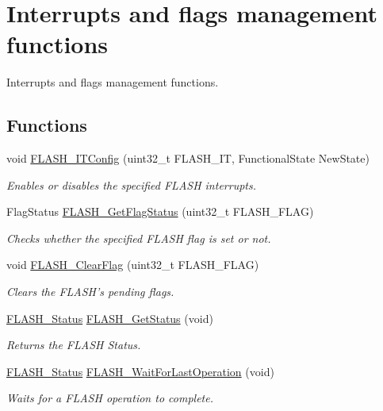 \hypertarget{group___f_l_a_s_h___group4}{\section{Interrupts and flags management functions}
\label{group___f_l_a_s_h___group4}
}


Interrupts and flags management functions.  


\subsection*{Functions}
\begin{DoxyCompactItemize}
\item 
void \hyperlink{group___f_l_a_s_h___group4_ga94c1e51a9c3bf8d48eb6eb4a4d054861}{F\-L\-A\-S\-H\-\_\-\-I\-T\-Config} (uint32\-\_\-t F\-L\-A\-S\-H\-\_\-\-I\-T, Functional\-State New\-State)
\begin{DoxyCompactList}\small\item\em Enables or disables the specified F\-L\-A\-S\-H interrupts. \end{DoxyCompactList}\item 
Flag\-Status \hyperlink{group___f_l_a_s_h___group4_gae3fb545e32f21501ca27d4380e0f2088}{F\-L\-A\-S\-H\-\_\-\-Get\-Flag\-Status} (uint32\-\_\-t F\-L\-A\-S\-H\-\_\-\-F\-L\-A\-G)
\begin{DoxyCompactList}\small\item\em Checks whether the specified F\-L\-A\-S\-H flag is set or not. \end{DoxyCompactList}\item 
void \hyperlink{group___f_l_a_s_h___group4_gac4be1d486483fa5cd70ec77d44ca8f87}{F\-L\-A\-S\-H\-\_\-\-Clear\-Flag} (uint32\-\_\-t F\-L\-A\-S\-H\-\_\-\-F\-L\-A\-G)
\begin{DoxyCompactList}\small\item\em Clears the F\-L\-A\-S\-H's pending flags. \end{DoxyCompactList}\item 
\hyperlink{group___f_l_a_s_h_gadc63a6f3404ff1f71229a66915e9cdc0}{F\-L\-A\-S\-H\-\_\-\-Status} \hyperlink{group___f_l_a_s_h___group4_gac265b8d1e7ea11e44ceee28797c3debb}{F\-L\-A\-S\-H\-\_\-\-Get\-Status} (void)
\begin{DoxyCompactList}\small\item\em Returns the F\-L\-A\-S\-H Status. \end{DoxyCompactList}\item 
\hyperlink{group___f_l_a_s_h_gadc63a6f3404ff1f71229a66915e9cdc0}{F\-L\-A\-S\-H\-\_\-\-Status} \hyperlink{group___f_l_a_s_h___group4_gaaf8ea3b00c9a5f5eca0df9a795b83f22}{F\-L\-A\-S\-H\-\_\-\-Wait\-For\-Last\-Operation} (void)
\begin{DoxyCompactList}\small\item\em Waits for a F\-L\-A\-S\-H operation to complete. \end{DoxyCompactList}\end{DoxyCompactItemize}


